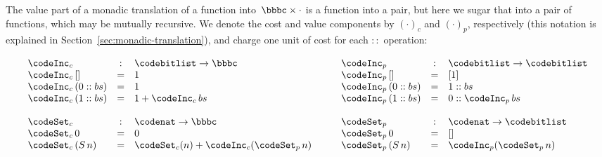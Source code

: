 \noindent
The value part of a monadic translation of a function into~$\bbbc\times\cdot$
is a function into a pair, but here we
sugar that into a pair of functions, which may be mutually recursive.  We
denote the cost and value components by $(\cdot)_c$ and $(\cdot)_p$,
respectively (this notation is explained in
Section~\ref{sec:monadic-translation}), and charge one unit of cost for each
$::$ operation:
\begin{small}
\[
\begin{array}[t]{lcl}
\codeInc_c &:& \codebitlist \to \bbbc \\
\codeInc_c\,[] &=& 1 \\
\codeInc_c\,(0 :: bs) &=& 1 \\
\codeInc_c\,(1 :: bs) &=& 1 + \codeInc_c\,bs
\\ \\
\codeSet_c &:& \codenat \to \bbbc \\
\codeSet_c\,0 &=& 0 \\
\codeSet_c\,(S\,n) &=& \codeSet_c(n) + \codeInc_c(\codeSet_p\,n)
\end{array}
\qquad
\begin{array}[t]{lcl}
\codeInc_p &:& \codebitlist \to \codebitlist \\
\codeInc_p\,[] &=& [1] \\
\codeInc_p\,(0 :: bs) &=& 1 :: bs \\
\codeInc_p\,(1 :: bs) &=& 0 :: \codeInc_p\,bs
\\ \\
\codeSet_p &:& \codenat \to \codebitlist \\
\codeSet_p\,0 &=& [] \\
\codeSet_p\,(S\,n) &=& \codeInc_p(\codeSet_p\,n)
\end{array}
\]
\end{small}

